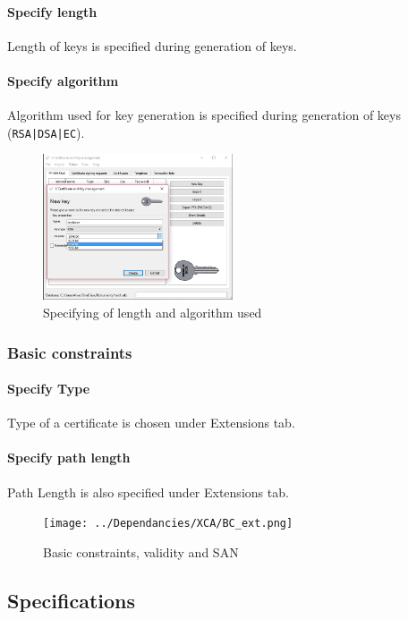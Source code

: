 \documentclass[10pt, a4paper]{report}
\begin{document}
      \paragraph{Specify length}
Length of keys is specified during generation of keys.
      \paragraph{Specify algorithm}
Algorithm used for key generation is specified during generation of keys (\verb+RSA|DSA|EC+).
\begin{figure}[!htbp]
 \caption{Specifying of length and algorithm used}
 \centering
  \includegraphics[width=0.5\textwidth]{../Dependancies/XCA/genKeylength.jpg}
\end{figure}


    \subsubsection{Basic constraints}
    
      \paragraph{Specify Type}
Type of a certificate is chosen under Extensions tab.
      \paragraph{Specify path length}
Path Length is also specified under Extensions tab.

\begin{figure}[!htbp]
 \caption{Basic constraints, validity and SAN}
 \centering
  \texttt{[image: ../Dependancies/XCA/BC\_ext.png]}
\end{figure}

  \subsection{Specifications}
  
\end{document}

